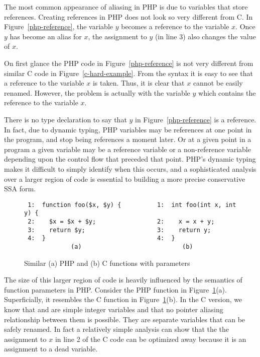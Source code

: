 The most common appearance of aliasing in PHP is due to variables that
store references. Creating references in PHP does not look so very
different from C. In Figure~\ref{php-reference}, the variable $y$
becomes a reference to the variable $x$. Once $y$ has become an alias
for $x$, the assignment to $y$ (in line 3) also changes the value of
$x$.

On first glance the PHP code in Figure~\ref{php-reference} is not very
different from similar C code in Figure~\ref{c-hard-example}. From the
syntax it is easy to see that a reference to the variable $x$ is
taken.  Thus, it is clear that $x$ cannot be easily renamed. However,
the problem is actually with the variable $y$ which contains the
reference to the variable $x$.

There is no type declaration to say that $y$ in Figure~\ref{php-reference} is a reference. In fact, due to dynamic typing,
PHP variables may be references at one point in the program, and stop
being references a moment later. Or at a given point in a program a
given variable may be a reference variable or a non-reference variable
depending upon the control flow that preceded that point.  PHP's
dynamic typing makes it difficult to simply identify when this occurs,
and a sophisticated analysis over a larger region of code is essential
to building a more precise conservative SSA form.

\begin{figure}[thp]
\begin{verbatim}
 1:  function foo($x, $y) {          1:  int foo(int x, int y) {
 2:    $x = $x + $y;                 2:    x = x + y;
 3:    return $y;                    3:    return y;
 4:  }                               4:  }
             (a)                            (b)
\end{verbatim}
\caption{Similar (a) PHP and (b) C functions with parameters}
\label{parameters}
\end{figure}

The size of this larger region of code is heavily influenced by the
semantics of function parameters in PHP. Consider the PHP function in
Figure~\ref{parameters}(a).
Superficially, it resembles the C function in Figure~\ref{parameters}(b).
In the C version, we know that  and  are simple integer
variables and that no pointer aliasing relationship between them is
possible.  They are separate variables that can be safely renamed. In
fact a relatively simple analysis can show that the the assignment to
$x$ in line 2 of the C code can be optimized away because it is an
assignment to a dead variable.

